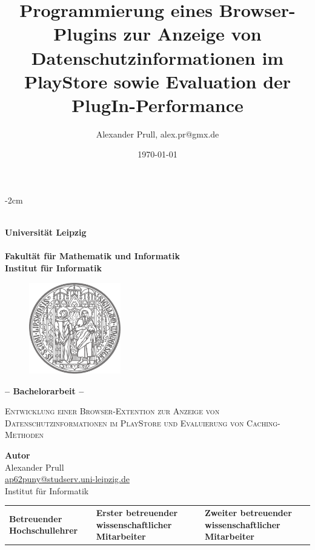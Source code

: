 \documentclass[11pt, a4paper, twoside, openright, final]{book}
\author{Alexander Prull, alex.pr@gmx.de}
\title{Programmierung eines Browser-Plugins zur Anzeige von Datenschutzinformationen im PlayStore sowie Evaluation der PlugIn-Performance}
\date{\today} %
\numberwithin{equation}{chapter}		%
\newcommand{\1}{\mathbbm{1}}
\begin{document}

\begin{titlepage}
	\begin{adjustwidth*}{}{-2cm}
		\begin{center}
			~\\		%
			\textbf{\Huge \sffamily	Universität Leipzig	\\	\small ~					\\
					\large \sffamily	Fakultät für Mathematik und Informatik	 \\
										Institut für Informatik				\\}
			
			\vspace{0.3cm}
			\begin{figure}[H]
	        	\hspace{5.1cm}
	       		\includegraphics[width=4cm]{siegel.png}
	        \end{figure}
	        \vspace{0.15cm}
			\textbf{\Large \sffamily -- Bachelorarbeit --}
			\vspace{0.5cm}
			
			 \textsc{ \LARGE
			Entwicklung einer Browser-Extention zur Anzeige von Datenschutzinformationen im PlayStore und Evaluierung von Caching-Methoden}
			
			\vspace{1.0cm}
			\textbf{Autor} \\
		Alexander Prull \\ 
		\href{mailto:ap62puny@studserv.uni-leipzig.de}{ap62puny@studserv.uni-leipzig.de} \\
		Institut für Informatik \\
		\end{center}
		
		\vfill
		
		\begin{tabular}{*{3}{C{4.5cm}}}
			\small \textbf{Betreuender Hochschullehrer} & 
			\small \textbf{Erster betreuender wissenschaftlicher Mitarbeiter} & 
			\small \textbf{Zweiter betreuender wissenschaftlicher Mitarbeiter} \\
			

\end{tabular}
\end{adjustwidth*}
\end{titlepage}
\end{document}
